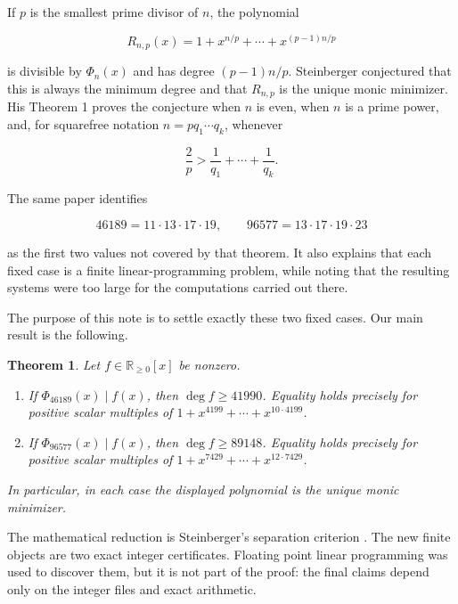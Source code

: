 \documentclass[11pt]{article}
\newtheorem{theorem}{Theorem}[section]
\numberwithin{equation}{section}
\begin{document}
If $p$ is the smallest prime divisor of $n$, the polynomial

\nopagebreak[4]
\[
R_{n,p}(x)=1+x^{n/p}+\cdots+x^{(p-1)n/p}
\tag{1.2}
\]

is divisible by $\Phi_n(x)$ and has degree $(p-1)n/p$. Steinberger \cite{steinberger2012}
conjectured that this is always the minimum degree and that $R_{n,p}$ is the
unique monic minimizer. His Theorem 1 proves the conjecture when $n$ is even,
when $n$ is a prime power, and, for squarefree notation
$n=pq_1\cdots q_k$, whenever

\nopagebreak[4]
\[
\frac{2}{p}>\frac1{q_1}+\cdots+\frac1{q_k}.
\tag{1.3}
\]

The same paper identifies

\nopagebreak[4]
\[
46189=11\cdot13\cdot17\cdot19,
\qquad
96577=13\cdot17\cdot19\cdot23
\tag{1.4}
\]

as the first two values not covered by that theorem. It also explains that
each fixed case is a finite linear-programming problem, while noting that the
resulting systems were too large for the computations carried out there.

The purpose of this note is to settle exactly these two fixed cases. Our main
result is the following.

\Needspace{0.28\textheight}
\begin{theorem}

Let $f\in\mathbb R_{\geq0}[x]$ be nonzero.

\begin{enumerate}
\item If $\Phi_{46189}(x)\mid f(x)$, then $\deg f\geq41990$. Equality holds
   precisely for positive scalar multiples of
   $1+x^{4199}+\cdots+x^{10\cdot4199}$.
\item If $\Phi_{96577}(x)\mid f(x)$, then $\deg f\geq89148$. Equality holds
   precisely for positive scalar multiples of
   $1+x^{7429}+\cdots+x^{12\cdot7429}$.

\end{enumerate}

In particular, in each case the displayed polynomial is the unique monic
minimizer.

\end{theorem}

The mathematical reduction is Steinberger's separation criterion \cite[Lemma~1]{steinberger2012}. The new finite objects are two exact integer certificates. Floating
point linear programming was used to discover them, but it is not part of the
proof: the final claims depend only on the integer files and exact arithmetic.
\end{document}

